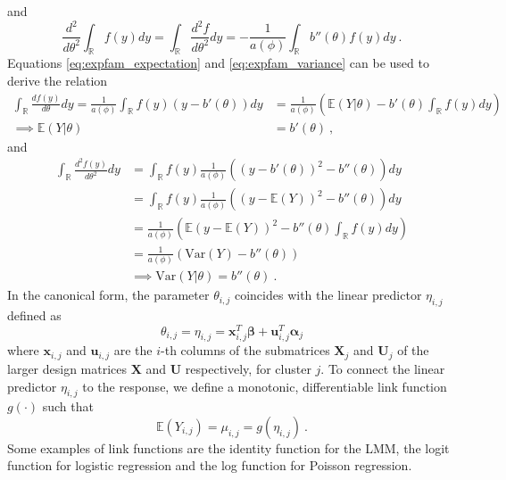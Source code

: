 and 
\begin{equation}
    \label{eq:expfam_variance}
    \frac{d^2}{d \theta^2} \int_{\mathbb{R}} f(y) dy = \int_{\mathbb{R}} \frac{d^2 f}{d\theta^2} dy = -\frac{1}{a(\phi)} \int_{\mathbb{R}} b''(\theta)f(y) dy \ .
\end{equation}
Equations \eqref{eq:expfam_expectation} and \eqref{eq:expfam_variance} can be used to derive the relation 
\begin{equation}
    \begin{aligned}
    \int_{\mathbb{R}} \frac{d f(y)}{d\theta} dy = \frac{1}{a(\phi)}\int_{\mathbb{R}} f(y) (y-b'(\theta)) dy &= \frac{1}{a(\phi)} \left(\mathbb{E}(Y \lvert \theta) - b'(\theta)\int_{\mathbb{R}}f(y)dy \right) \\
    \implies \mathbb{E}(Y \lvert \theta) &= b'(\theta) \ ,
    \end{aligned}
\end{equation}
and 
\begin{equation}
    \begin{aligned}
    \int_{\mathbb{R}} \frac{d^2 f(y)}{d\theta^2} dy &= \int_{\mathbb{R}} f(y) \frac{1}{a(\phi)} \left( (y-b'(\theta))^2 - b''(\theta) \right) dy \\
    &= \int_{\mathbb{R}} f(y) \frac{1}{a(\phi)} \left( (y-\mathbb{E}(Y))^2 - b''(\theta) \right) dy \\
    &= \frac{1}{ a(\phi)} \left( \mathbb{E}(y-\mathbb{E}(Y))^2- b''(\theta) \int_{\mathbb{R}} f(y)dy \right) \\
    & = \frac{1}{a(\phi)}\left( \text{Var}(Y) - b''(\theta) \right) \\
    & \implies \text{Var}(Y \lvert \theta) = b''(\theta) \ .
    \end{aligned}
\end{equation}
In the canonical form, the parameter $\theta_{i, j}$ coincides with the linear predictor $\eta_{i, j}$ defined as
\begin{equation}
    \theta_{i, j} = \eta_{i, j} = \mathbf{x}_{i, j}^T\boldsymbol{\beta} + \mathbf{u}_{i, j}^T \boldsymbol{\alpha}_j %
\end{equation}
where $\mathbf{x}_{i, j}$ and $\mathbf{u}_{i, j}$ are the $i$-th columns of the submatrices $\mathbf{X}_{j}$ and $\mathbf{U}_{j}$ of the larger design matrices $\mathbf{X}$ and $\mathbf{U}$ respectively, for cluster $j$.
To connect the linear predictor $\eta_{i, j}$ to the response, we define a monotonic, differentiable link function $g(\cdot)$ such that
\begin{equation}
    \mathbb{E}(Y_{i, j}) = \mu_{i, j} = g(\eta_{i, j}) \ .
\end{equation} 
Some examples of link functions are the identity function for the LMM, the logit function for logistic regression and the log function for Poisson regression.



